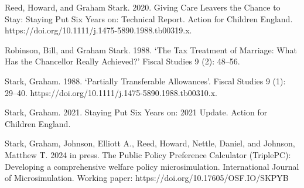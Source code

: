 \documentclass[
  letterpaper,
  DIV=11,
  numbers=noendperiod]{scrartcl}
\begin{document}
Reed, Howard, and Graham Stark. 2020. Giving Care Leavers the Chance to
Stay: Staying Put Six Years on: Technical Report. Action for Children
England. https://doi.org/10.1111/j.1475-5890.1988.tb00319.x.

Robinson, Bill, and Graham Stark. 1988. `The Tax Treatment of Marriage:
What Has the Chancellor Really Achieved?' Fiscal Studies 9 (2): 48--56.

Stark, Graham. 1988. `Partially Transferable Allowances'. Fiscal Studies
9 (1): 29--40. https://doi.org/10.1111/j.1475-5890.1988.tb00310.x.

Stark, Graham. 2021. Staying Put Six Years on: 2021 Update. Action for
Children England.

Stark, Graham, Johnson, Elliott A., Reed, Howard, Nettle, Daniel, and
Johnson, Matthew T. 2024 in press. The Public Policy Preference
Calculator (TriplePC): Developing a comprehensive welfare policy
microsimulation. International Journal of Microsimulation. Working
paper: https://doi.org/10.17605/OSF.IO/SKPYB
\end{document}
